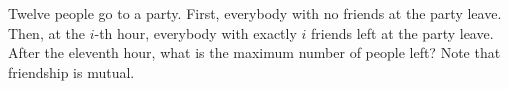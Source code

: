 Twelve people go to a party. First, everybody with no friends at the party leave. Then, at the $i$-th hour, everybody with exactly $i$ friends left at the party leave. After the eleventh hour, what is the maximum number of people left? Note that friendship is mutual.